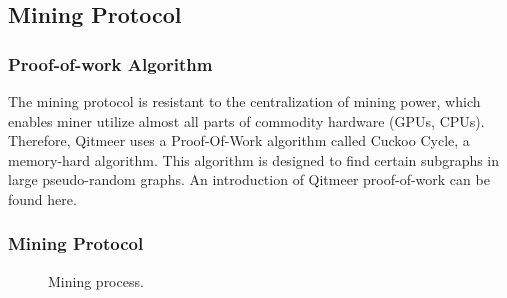\documentclass[a4paper,11pt]{article}
\begin{document}
\subsection{Mining Protocol}
\subsubsection{Proof-of-work Algorithm}

The mining protocol is resistant to the centralization of mining power, which enables miner utilize almost all parts of commodity hardware (GPUs, CPUs).
Therefore, Qitmeer uses a Proof-Of-Work algorithm called Cuckoo Cycle\cite{cuckoocycle},
a memory-hard algorithm. This algorithm is designed to find certain subgraphs in large pseudo-random graphs.
An introduction of Qitmeer proof-of-work can be found here.\cite{qitmeerpow}

\subsubsection{Mining Protocol}

\begin{figure}[ht]
	\centerline{%
	}
	\caption{Mining process.}
\end{figure}
\end{document}
